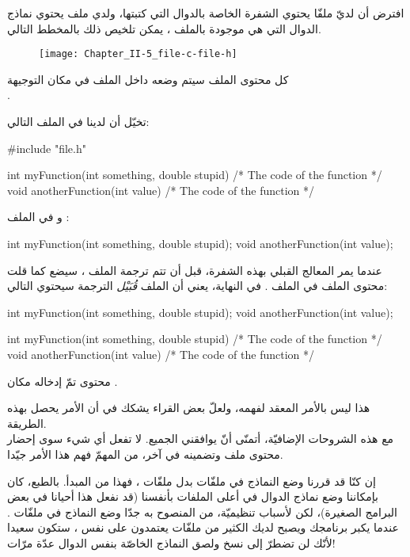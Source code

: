 افترض أن لديّ ملفّا
يحتوي الشفرة الخاصة بالدوال التي كتبتها، ولدي ملف
يحتوي نماذج الدوال التي هي موجودة بالملف
،
يمكن تلخيص ذلك بالمخطط التالي.

\begin{figure}[H]
	\centering
	\texttt{[image: Chapter\_II-5\_file-c-file-h]}
\end{figure}
كل محتوى الملف
سيتم وضعه داخل الملف
في مكان التوجيهة\\
.

تخيّل أن لدينا في الملف
التالي:

\begin{Csource}
#include "file.h"

int myFunction(int something, double stupid)
{
  /* The code of the function */
}
void anotherFunction(int value)
{
  /* The code of the function */
}
\end{Csource}

و في الملف
:

\begin{Csource}
int myFunction(int something, double stupid);
void anotherFunction(int value);
\end{Csource}

عندما يمر المعالج القبلي بهذه الشفرة، قبل أن تتم ترجمة الملف
،
سيضع كما قلت محتوى الملف
 في الملف
.
في النهاية، يعني أن الملف
\textit{قُبَيْل}
الترجمة سيحتوي التالي:

\begin{Csource}
int myFunction(int something, double stupid);
void anotherFunction(int value);

int myFunction(int something, double stupid)
{
  /* The code of the function */
}
void anotherFunction(int value)
{
  /* The code of the function */
}
\end{Csource}

محتوى
تمّ إدخاله مكان
.

هذا ليس بالأمر المعقد لفهمه، ولعلّ بعض القراء يشكك في أن الأمر يحصل بهذه الطريقة.\\
مع هذه الشروحات الإضافيّة، أتمنّى أنّ يوافقني الجميع.
لا تفعل أي شيء سوى إحضار محتوى ملف وتضمينه في آخر، من المهمّ فهم هذا الأمر جيّدا.

\begin{information}
  إن كنّا قد قررنا وضع النماذج في ملفّات
بدل ملفّات
،
فهذا من المبدأ.
بالطبع، كان بإمكاننا وضع نماذج الدوال في أعلى الملفات
بأنفسنا (قد نفعل هذا أحيانا في بعض البرامج الصغيرة)، لكن لأسباب تنظيميّة، من المنصوح به جدّا وضع النماذج في ملفّات
.
 عندما يكبر برنامجك ويصبح لديك الكثير من ملفّات
يعتمدون على نفس
،
ستكون سعيدا لأنّك لن تضطرّ إلى نسخ ولصق النماذج الخاصّة بنفس الدوال عدّة مرّات!
\end{information}


